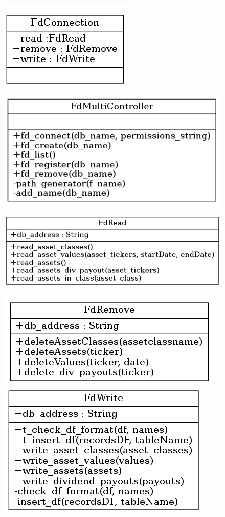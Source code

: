 \documentclass[main.tex]{subfiles}
\begin{document}
\begin{figure}[H]
   \centering
   \includegraphics[scale=2.0,keepaspectratio]{Report/08Appendices/084UML/084Pictures/classes_Finda_1.png}
   \includegraphics[scale=2.0,keepaspectratio]{Report/08Appendices/084UML/084Pictures/classes_Finda_2.png}
   \includegraphics[scale=2.0,keepaspectratio]{Report/08Appendices/084UML/084Pictures/classes_Finda_3.png}
   \includegraphics[scale=2.0,keepaspectratio]{Report/08Appendices/084UML/084Pictures/classes_Finda_4.png}
   \includegraphics[scale=2.0,keepaspectratio]{Report/08Appendices/084UML/084Pictures/classes_Finda_5.png}

\end{figure}
\end{document}
